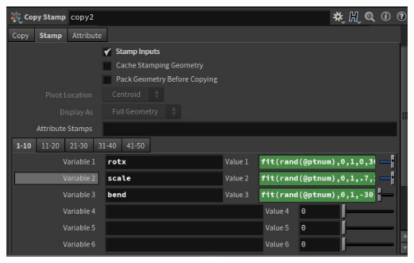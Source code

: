\documentclass[paper=a4,fontsize=12pt,ngerman]{scrartcl}
\begin{document}
\begin{enumerate}
\begin{itemize}
\begin{minipage}{0.5\textwidth}
			 	\includegraphics[width=\textwidth]{graphics/copy_stamp.jpg}
			 \end{minipage} 
		\end{itemize}


\end{enumerate}
\end{document}

